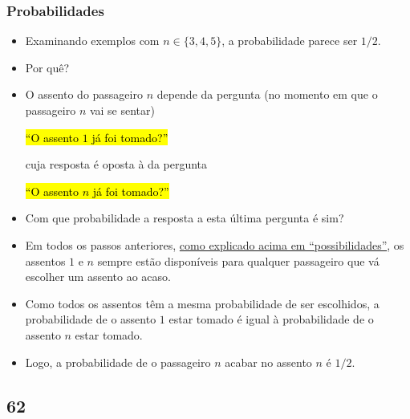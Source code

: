 \documentclass[
  11pt]{report}
\begin{document}
\hypertarget{probabilidades}{%
\subsubsection*{Probabilidades}\label{probabilidades}}

\begin{itemize}
\item
  Examinando exemplos com $n \in \{3, 4, 5\}$, a probabilidade parece ser $1/2$.
\item
  Por quê?
\item
  O assento do passageiro $n$ depende da pergunta (no momento em que o passageiro $n$ vai se sentar)

  {\hl{``O assento $1$ já foi tomado?''}}

  cuja resposta é oposta à da pergunta

  {\hl{``O assento $n$ já foi tomado?''}}
\item
  Com que probabilidade a resposta a esta última pergunta é sim?
\item
  Em todos os passos anteriores, \protect\hyperlink{possibilidades}{como explicado acima em ``possibilidades''}, os assentos $1$ e $n$ sempre estão disponíveis para qualquer passageiro que vá escolher um assento ao acaso.
\item
  Como todos os assentos têm a mesma probabilidade de ser escolhidos, a probabilidade de o assento $1$ estar tomado é igual à probabilidade de o assento $n$ estar tomado.
\item
  Logo, a probabilidade de o passageiro $n$ acabar no assento $n$ é $1/2$.
\end{itemize}

\hypertarget{section-7}{%
\subsection*{62}\label{section-7}}
\end{document}
